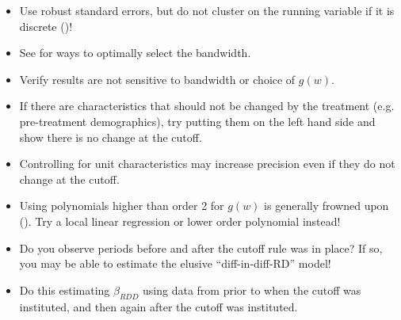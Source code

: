 
\begin{itemize}
    \item Use robust standard errors, but do not cluster on the running variable if it is discrete (\cite{kolesar})!
\end{itemize}




\begin{itemize}
\item See \cite{cattaneo} for ways to optimally select the bandwidth.
\item Verify results are not sensitive to bandwidth or choice of $g(w)$.
\item If there are characteristics that should not be changed by the treatment (e.g. pre-treatment demographics), try putting them on the left hand side and show there is no change at the cutoff.
\item Controlling for unit characteristics may increase precision even if they do not change at the cutoff.
\item Using polynomials higher than order 2 for $g(w)$ is generally frowned upon (\cite{gelman}). Try a local linear regression or lower order polynomial instead!
    \end{itemize}






\begin{itemize}
    \item Do you observe periods before and after the cutoff rule was in place? If so, you may be able to estimate the elusive ``diff-in-diff-RD'' model!
    \item Do this estimating $\beta_{RDD}$ using data from prior to when the cutoff was instituted, and then again after the cutoff was instituted. 
\end{itemize}




